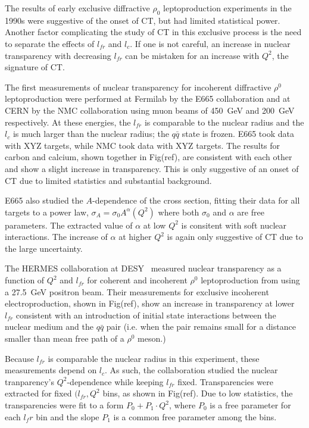 The results of early exclusive diffractive $\rho_0$ leptoproduction
experiments in the 1990s were suggestive of the onset of CT, but had limited
statistical power.
Another factor complicating the study of CT in this exclusive process is the
need to separate the effects of $l_{fr}$ and $l_c$.
If one is not careful, an increase in nuclear transparency with decreasing
$l_{fr}$ can be mistaken for an increase with $Q^2$, the signature of CT.


The first measurements of nuclear transparency for incoherent diffractive
$\rho^0$ leptoproduction were performed
at Fermilab by the E665 collaboration \cite{Adams_1995} and
at CERN by the NMC collaboration \cite{Arneodo_1994}
using muon beams of \SI{450}{\giga\electronvolt} and
\SI{200}{\giga\electronvolt} respectively.
At these energies, the $l_{fr}$ is comparable to the nuclear radius and
the $l_c$ is much larger than the nuclear radius; the $q\bar{q}$
state is frozen.
E665 took data with XYZ targets, while NMC took data with XYZ targets.
The results for carbon and calcium, shown together in Fig(ref), are consistent
with each other and show a slight increase in transparency.
This is only suggestive of an onset of CT due to limited statistics and
substantial background.


E665 also studied the $A$-dependence of the cross section, fitting their data
for all targets to a power law, $\sigma_A=\sigma_0A^\alpha(Q^2)$ where both
$\sigma_0$ and $\alpha$ are free parameters.
The extracted value of $\alpha$ at low $Q^2$ is consitent with soft nuclear
interactions.
The increase of $\alpha$ at higher $Q^2$ is again only suggestive of CT due to
the large uncertainty.


The HERMES collaboration at DESY~\cite{Ackerstaff_1999} measured nuclear
transparency as a function of $Q^2$ and $l_{fr}$ for coherent and incoherent
$\rho^0$ leptoproduction from  using a \SI{27.5}{\giga\electronvolt}
positron beam.
Their measurements for exclusive incoherent electroproduction, shown in
Fig(ref), show an increase in transparency at lower $l_{fr}$ consistent with an
introduction of initial state interactions between the nuclear medium and the
$q\bar{q}$ pair (i.e. when the pair remains small for a distance smaller than
mean free path of a $\rho^0$ meson.)


Because $l_{fr}$ is comparable the nuclear radius in this experiment, these
measurements depend on $l_c$.
As such, the collaboration studied the nuclear tranparency's $Q^2$-dependence
while keeping $l_{fr}$ fixed.
Transparencies were extracted for fixed $(l_{fr},Q^2$ bins, as shown in
Fig(ref).
Due to low statistics, the transparencies were fit to a form
$P_0 + P_1 \cdot Q^2$, where $P_0$ is a free parameter for each $l_fr$ bin and
the slope $P_1$ is a common free parameter among the bins.


